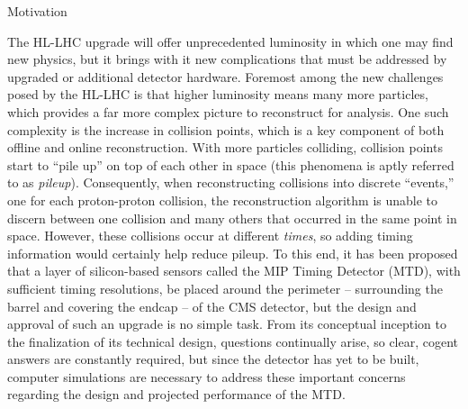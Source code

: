%
%

\begin{section}{Motivation}

The HL-LHC upgrade will offer unprecedented luminosity in which one may find new physics, but it brings with it new complications that must be addressed by upgraded or additional detector hardware. Foremost among the new challenges posed by the HL-LHC is that higher luminosity means many more particles, which provides a far more complex picture to reconstruct for analysis. One such complexity is the increase in collision points, which is a key component of both offline and online reconstruction. With more particles colliding, collision points start to ``pile up'' on top of each other in space (this phenomena is aptly referred to as \textit{pileup}). Consequently, when reconstructing collisions into discrete ``events,'' one for each proton-proton collision, the reconstruction algorithm is unable to discern between one collision and many others that occurred in the same point in space. However, these collisions occur at different \textit{times}, so adding timing information would certainly help reduce pileup. To this end, it has been proposed that a layer of silicon-based sensors called the MIP Timing Detector (MTD), with sufficient timing resolutions, be placed around the perimeter -- surrounding the barrel and covering the endcap -- of the CMS detector, but the design and approval of such an upgrade is no simple task. From its conceptual inception to the finalization of its technical design, questions continually arise, so clear, cogent answers are constantly required, but since the detector has yet to be built, computer simulations are necessary to address these important concerns regarding the design and projected performance of the MTD.

\end{section}

